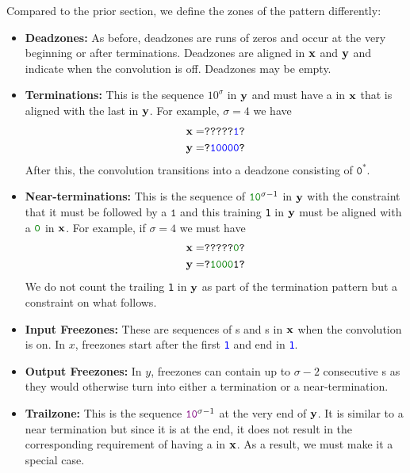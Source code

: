 Compared to the prior section, we define the zones of the pattern differently:
\begin{itemize}

  \item \textbf{Deadzones:} As before, deadzones are runs of zeros and occur at the very beginning or after terminations. Deadzones are aligned in $\mathbf{x}$ and $\mathbf{y}$ and indicate when the convolution is off. Deadzones may be empty.

  \item \textbf{Terminations:} This is the sequence $10^{\sigma}$ in $\mathbf{y}$ and must have a  in $\mathbf{x}$ that is aligned with the last  in $\mathbf{y}$. For example, $\sigma=4$ we have
    \begin{align*}
      \mathbf{x}=& \texttt{?????\texttt{\textcolor{blue}{1}}?}\\
      \mathbf{y}=&\texttt{?\texttt{\textcolor{blue}{10000}}?}
    \end{align*}
    After this, the convolution transitions into a deadzone consisting of $\texttt{0}^*$.

  \item \textbf{Near-terminations:} This is the sequence of $\green{10}^{\sigma-1}$ in $\mathbf{y}$ with the constraint that it must be followed by a $\texttt{1}$ and this training \texttt{1} in $\mathbf{y}$ must be aligned with a $\green{0}$ in $\mathbf{x}$. For example, if $\sigma=4$ we must have
    \begin{align*}
      \xv=& \texttt{?????\green{0}?}\\
      \yv=&\texttt{?\green{1000}1?}
    \end{align*}
    We do not count the trailing \texttt{1} in $\mathbf{y}$ as part of the termination pattern but a constraint on what follows.

  \item \textbf{Input Freezones:} These are sequences of \texttt{}s and \texttt{}s in $\mathbf{x}$ when the convolution is on. In $x$, freezones start after the first  \texttt{\textcolor{blue}{1}} and end in \texttt{\textcolor{blue}{1}}.

  \item \textbf{Output Freezones:} In $y$, freezones can contain up to $\sigma-2$ consecutive \texttt{}s as they would otherwise turn into either a termination or a near-termination.

  \item \textbf{Trailzone:} This is the sequence $\texttt{\textcolor{violet}{10}}^{\sigma-1}$ at the very end of $\mathbf{y}$. It is similar to a near termination but since it is at the end, it does not result in the corresponding requirement of having a  in $\mathbf{x}$. As a result, we must make it a special case.
\end{itemize}

